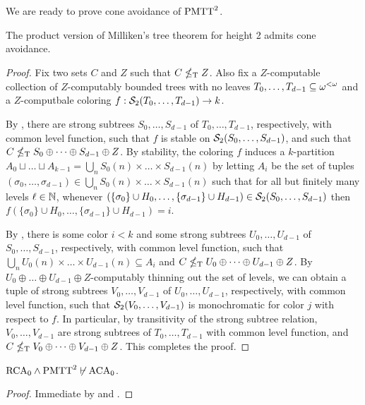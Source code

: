 We are ready to prove cone avoidance of $\mathrm{PMTT}^{2}_{}$.

\begin{theorem}\label{thm:cone-avoidance-MTT2}
  The product version of Milliken's tree theorem for height 2 admits cone avoidance.
\end{theorem}
\begin{proof}
Fix two sets $C$ and $Z$ such that $C \nleq_{\text{\upshape T}} Z$.
Also fix a $Z$-computable collection of $Z$-computably bounded trees with no leaves $T_0, \dots,\allowbreak T_{d-1} \subseteq {\omega^{<\omega}}$ and a $Z$-computbale coloring $f: \mathcal{S}_{2}({T_0, \dots, T_{d-1}}) \to k$.
 
By , there are strong subtrees $S_0, \dots, S_{d-1}$ of $T_0, \dots, T_{d-1}$, respectively, with common level function, such that $f$ is stable on $\mathcal{S}_{2}({S_0, \dots, S_{d-1}})$, and such that $C \nleq_{\text{\upshape T}} S_0 \oplus \dots \oplus S_{d-1} \oplus Z$. By stability, the coloring $f$ induces a $k$-partition $A_0 \sqcup \dots \sqcup A_{k-1} = \bigcup_n S_0(n) \times \dots \times S_{d-1}(n)$ by letting
$A_i$ be the set of tuples $(\sigma_0, \dots, \sigma_{d-1}) \in \bigcup_n S_0(n) \times \dots \times S_{d-1}(n)$ such that for all but finitely many levels $\ell \in \mathbb{N}$,
whenever $(\{\sigma_0\} \cup H_0, \dots, \{\sigma_{d-1}\} \cup H_{d-1}) \in \mathcal{S}_{2}({S_0, \dots, S_{d-1}})$
then $f( \{\sigma_0\} \cup H_0, \dots, \{\sigma_{d-1}\} \cup H_{d-1} ) = i$.

By , there is some color $i < k$
and some strong subtrees $U_0, \dots, U_{d-1}$ of $S_0, \dots, S_{d-1}$, respectively, with common level function, such that $\bigcup_n U_0(n) \times \dots \times U_{d-1}(n) \subseteq A_i$ and $C \nleq_{\text{\upshape T}} U_0 \oplus \dots \oplus U_{d-1} \oplus Z$.
By $U_0 \oplus \dots \oplus U_{d-1} \oplus Z$-computably thinning out the set of levels,
we can obtain a tuple of strong subtrees $V_0, \dots, V_{d-1}$ of $U_0, \dots, U_{d-1}$, respectively, with common level function, such that
$\mathcal{S}_{2}({V_0,\dots, V_{d-1}})$ is monochromatic for color $j$ with respect to $f$.
In particular, by transitivity of the strong subtree relation, $V_0, \dots, V_{d-1}$ are strong 
subtrees of $T_0, \dots, T_{d-1}$ with common level function, and $C \nleq_{\text{\upshape T}} V_0 \oplus \dots \oplus V_{d-1} \oplus Z$.
This completes the proof.
\end{proof}

\begin{corollary}
$\mathrm{RCA}_0 \wedge \mathrm{PMTT}^{2}_{}\not\vdash\mathrm{ACA}_0$.
\end{corollary}
\begin{proof}
Immediate by  and .
\end{proof}


